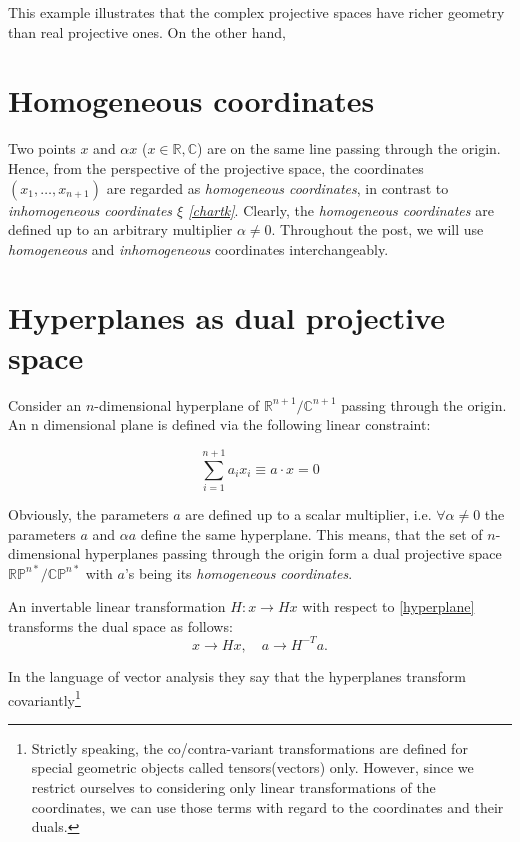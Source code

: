 \documentclass[a4paper,10pt]{article}
\begin{document}
This example illustrates that the complex projective spaces have richer geometry than real projective ones. On the other hand, 

\section{Homogeneous coordinates}

Two points $x$ and $\alpha x$  ($x \in \mathbb{R},\mathbb{C}$) are on the same line passing through the origin. Hence, from the perspective of the projective space, the coordinates $(x_1, \ldots, x_{n+1})$ are regarded as {\it homogeneous coordinates}, in contrast to {\it inhomogeneous coordinates $\xi$ \eqref{chartk}}. Clearly, the {\it homogeneous coordinates} are defined up to an arbitrary multiplier $\alpha \neq 0$. Throughout the post, we will use {\it homogeneous}  and {\it inhomogeneous} coordinates interchangeably.

\section{Hyperplanes as dual projective space}

Consider an $n$-dimensional hyperplane of $\mathbb{R}^{n+1}/\mathbb{C}^{n+1}$ passing through the origin. An n dimensional plane is defined via the following linear constraint:

\begin{equation}
 \sum\limits_{i=1}^{n+1} a_i x_i \equiv a\cdot x = 0\label{hyperplane}
\end{equation}

Obviously, the parameters $a$ are defined up to a scalar multiplier, i.e. $\forall\alpha\neq 0$ the parameters $a$ and $\alpha a$ define the same hyperplane. This means, that the set of $n$-dimensional hyperplanes passing through the origin form a dual projective space $\mathbb{RP}^{n*}/\mathbb{CP}^{n*}$ with $a$'s being its {\it homogeneous coordinates}. 

An invertable linear transformation $H: x \to H x$ with respect to \eqref{hyperplane} transforms the dual space as follows:
\begin{equation}
 x\to Hx, \quad a\to H^{-T} a.
\end{equation}

In the language of vector analysis they say that the hyperplanes transform covariantly\footnote{ Strictly speaking, the co/contra-variant transformations are defined for special geometric objects called tensors(vectors) only. However, since we restrict ourselves to considering only linear transformations of the coordinates, we can use those terms with regard to the coordinates and their duals. }
\end{document}
